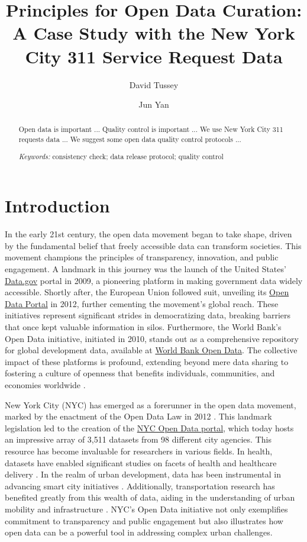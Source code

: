 \documentclass[12pt, titlepage]{article}
\title{Principles for Open Data Curation: A Case Study with the New
  York City 311 Service Request Data}
\author[1]{David Tussey}
\author[2]{Jun Yan}
\affil[1]{Former Executive Director, NYC DoITT}
\affil[2]{Department of Statistics, University of Connecticut}
\begin{document}
\maketitle


\begin{abstract}
  Open data is important ...
  Quality control is important ...
  We use New York City 311 requests data  ...
  We suggest some open data quality control protocols ...


\bigskip
  
\noindent
{\it Keywords:}
consistency check;    
data release protocol;
quality control
\end{abstract}

\doublespacing

\section{Introduction} \label{sec:intro}

In the early 21st century, the open data movement began to take shape,
driven by the fundamental belief that freely accessible data can
transform societies. This movement champions the principles of
transparency, innovation, and public engagement. A landmark in this
journey was the launch of the United States'
\href{https://www.data.gov}{Data.gov} portal in 2009, a pioneering
platform in making government data widely accessible. Shortly after,
the European Union followed suit, unveiling its
\href{https://data.europa.eu/euodp}{Open Data Portal} in 2012, further
cementing the movement's global reach. These initiatives represent
significant strides in democratizing data, breaking barriers that once
kept valuable information in silos. Furthermore, the World Bank's Open
Data initiative, initiated in 2010, stands out as a comprehensive
repository for global development data, available at
\href{https://data.worldbank.org}{World Bank Open Data}. The
collective impact of these platforms is profound, extending beyond
mere data sharing to fostering a culture of openness that benefits
individuals, communities, and economies worldwide
\citep{janssen2012benefits, barns2016mine, wang2016adoption}.


New York City (NYC) has emerged as a forerunner in the open data
movement, marked by the enactment of the Open Data Law in 2012
\citep{zuiderwijk2014open}. This landmark legislation led to the
creation of the \href{https://opendata.cityofnewyork.us}{NYC Open Data
  portal}, which today hosts an impressive array of 3,511 datasets
from 98 different city agencies. This resource has become invaluable
for researchers in various fields. In health, datasets have enabled
significant studies on facets of health and healthcare delivery
\citep{cantor2018facets, shankar2021data}. In the realm of urban
development, data has been instrumental in advancing smart city
initiatives \citep{neves2020impacts}. Additionally, transportation
research has benefited greatly from this wealth of data, aiding in the
understanding of urban mobility and infrastructure
\citep{gerte2019understanding}. NYC's Open Data initiative not only
exemplifies commitment to transparency and public engagement but also
illustrates how open data can be a powerful tool in addressing complex
urban challenges.
\end{document}
